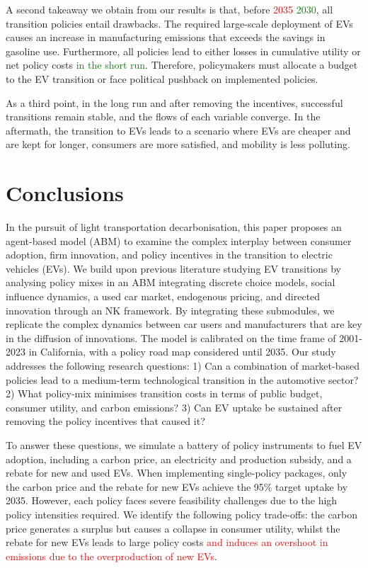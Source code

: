 \documentclass[12pt]{article}
\begin{document}
	A second takeaway we obtain from our results is that, before \textcolor{red}{2035} \textcolor{green}{2030}, all transition policies entail drawbacks. The required large-scale deployment of EVs causes an increase in manufacturing emissions that exceeds the savings in gasoline use. Furthermore, all policies lead to either losses in cumulative utility or net policy costs \textcolor{green}{in the short run}. Therefore, policymakers must allocate a budget to the EV transition or face political pushback on implemented policies.
	
	As a third point, in the long run and after removing the incentives, successful transitions remain stable, and the flows of each variable converge. In the aftermath, the transition to EVs leads to a scenario where EVs are cheaper and are kept for longer, consumers are more satisfied, and mobility is less polluting. 	
	
	\section{Conclusions} \label{Sec_concl}
	In the pursuit of light transportation decarbonisation, this paper proposes an agent-based model (ABM) to examine the complex interplay between consumer adoption, firm innovation, and policy incentives in the transition to electric vehicles (EVs). We build upon previous literature studying EV transitions by analysing policy mixes in an ABM integrating discrete choice models, social influence dynamics, a used car market, endogenous pricing, and directed innovation through an NK framework. By integrating these submodules, we replicate the complex dynamics between car users and manufacturers that are key in the diffusion of innovations. The model is calibrated on the time frame of 2001-2023 in California, with a policy road map considered until 2035. Our study addresses the following research questions: 1) Can a combination of market-based policies lead to a medium-term technological transition in the automotive sector? 2) What policy-mix minimises transition costs in terms of public budget, consumer utility, and carbon emissions? 3) Can EV uptake be sustained after removing the policy incentives that caused it? 
	
	To answer these questions, we simulate a battery of policy instruments to fuel EV adoption, including a carbon price, an electricity and production subsidy, and a rebate for new and used EVs. When implementing single-policy packages, only the carbon price and the rebate for new EVs achieve the 95\% target uptake by 2035. However, each policy faces severe feasibility challenges due to the high policy intensities required. We identify the following policy trade-offs: the carbon price generates a surplus but causes a collapse in consumer utility, whilst the rebate for new EVs leads to large policy costs \textcolor{red}{and induces an overshoot in emissions due to the overproduction of new EVs}.
	
\end{document}
